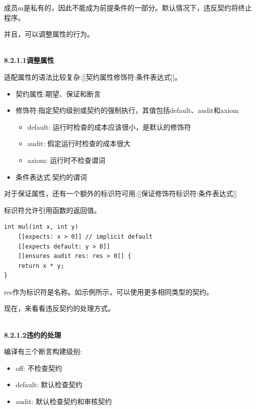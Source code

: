 成员m是私有的，因此不能成为前提条件的一部分。默认情况下，违反契约将终止程序。

并且，可以调整属性的行为。

\hspace*{\fill} \\ %
\noindent
\textbf{8.2.1.1\hspace{0.2cm}调整属性}

适配属性的语法比较复杂:[[契约属性修饰符:条件表达式]]。

\begin{itemize}
\item 
契约属性:期望、保证和断言

\item 
修饰符:指定契约级别或契约的强制执行，其值包括default、audit和axiom
\begin{itemize}
\item 
default: 运行时检查的成本应该很小，是默认的修饰符

\item 
audit: 假定运行时检查的成本很大

\item 
axiom: 运行时不检查谓词
\end{itemize}

\item 
条件表达式:契约的谓词
\end{itemize}

对于保证属性，还有一个额外的标识符可用:[[保证修饰符标识符:条件表达式]]

标识符允许引用函数的返回值。

\begin{lstlisting}[style=styleCXX]
int mul(int x, int y)
	[[expects: x > 0]] // implicit default
	[[expects default: y > 0]]
	[[ensures audit res: res > 0]] {
	return x * y;
}
\end{lstlisting}

res作为标识符是名称。如示例所示，可以使用更多相同类型的契约。

现在，来看看违反契约的处理方式。

\hspace*{\fill} \\ %
\noindent
\textbf{8.2.1.2\hspace{0.2cm}违约的处理}

编译有三个断言构建级别:

\begin{itemize}
\item 
off: 不检查契约

\item 
default: 默认检查契约

\item 
audit: 默认检查契约和审核契约
\end{itemize}

